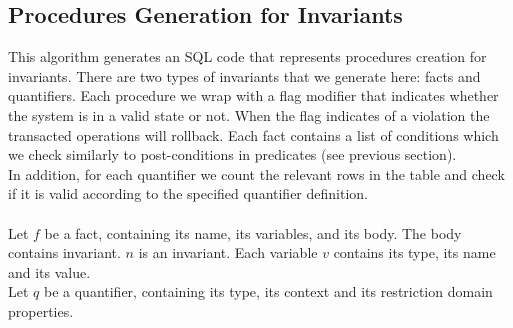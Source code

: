\documentclass[oneside]{book}
\begin{document}
\newpage

\subsection{Procedures Generation for Invariants}

This algorithm generates an SQL code that represents procedures creation for invariants. There are two types of invariants that we generate here: facts and quantifiers. Each procedure we wrap with a flag modifier that indicates whether the system is in a valid state or not. When the flag indicates of a violation the transacted operations will rollback. Each fact contains a list of conditions which we check similarly to post-conditions in predicates (see previous section).\\
In addition, for each quantifier we count the relevant rows in the table and check if it is valid according to the specified quantifier definition.
\\\\
Let $f$ be a fact, containing its name, its variables, and its body. The body contains invariant. $n$ is an invariant. Each variable $v$ contains its type, its name and its value.\\
Let $q$ be a quantifier, containing its type, its context and its restriction domain properties.
\end{document}
